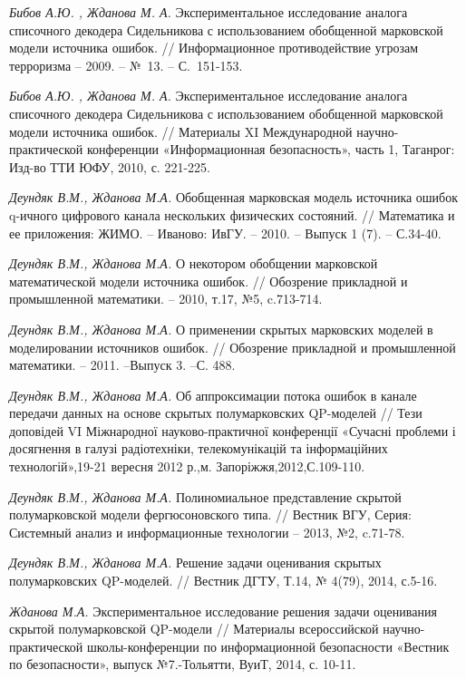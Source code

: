 \documentclass[twoside,12pt]{article}
\begin{document}
\vspace{-10mm} \begin{thebibliography}{99} \small
\emph{Бибов А.Ю. , Жданова М. А.} Экспериментальное исследование аналога списочного декодера Сидельникова с использованием обобщенной марковской модели источника ошибок.
// Информационное противодействие угрозам  терроризма -- 2009. -- №~13. -- С.~151-153.

\emph{Бибов А.Ю. , Жданова М. А.} Экспериментальное исследование аналога списочного декодера Сидельникова с использованием обобщенной марковской модели источника ошибок. // Материалы XI Международной научно-практической конференции «Информационная безопасность», часть 1, Таганрог: Изд-во ТТИ ЮФУ, 2010, с. 221-225.

\emph{Деундяк В.М., Жданова М.А.} Обобщенная марковская модель источника ошибок q-ичного цифрового канала нескольких физических состояний. // Математика и ее приложения: ЖИМО. -- Иваново: ИвГУ. -- 2010. -- Выпуск 1 (7). --  С.34-40.

 \emph{Деундяк В.М., Жданова М.А.} О некотором обобщении  марковской математической модели источника ошибок. // Обозрение  прикладной и промышленной математики. -- 2010, т.17, №5, c.713-714.

 \emph{Деундяк В.М., Жданова М.А.} О применении скрытых марковских моделей в моделировании источников ошибок. // Обозрение  прикладной и промышленной математики. -- 2011. --Выпуск 3. --С. 488.

     \emph{Деундяк В.М., Жданова М.А.} Об аппроксимации потока ошибок в канале передачи данных на основе скрытых полумарковских QP-моделей // Тези доповідей VI Міжнародної науково-практичної конференції «Сучасні проблеми і досягнення в галузі радіотехніки, телекомунікацій та інформаційних технологій»,19-21 вересня 2012 р.,м. Запоріжжя,2012,С.109-110.

 \emph{Деундяк В.М., Жданова М.А.} Полиномиальное представление скрытой полумарковской модели
фергюсоновского типа. // Вестник ВГУ, Серия: Системный анализ и информационные технологии -- 2013, №2, c.71-78.

\emph{Деундяк В.М., Жданова М.А.} Решение задачи оценивания  скрытых полумарковских QP-моделей. // Вестник ДГТУ, Т.14, № 4(79), 2014, с.5-16.

\emph{Жданова М.А.} Экспериментальное исследование решения задачи оценивания скрытой полумарковской QP-модели // Материалы всероссийской научно-практической школы-конференции по информационной безопасности «Вестник по безопасности», выпуск №7.-Тольятти, ВуиТ, 2014, с. 10-11.


\end{thebibliography}
\end{document}
